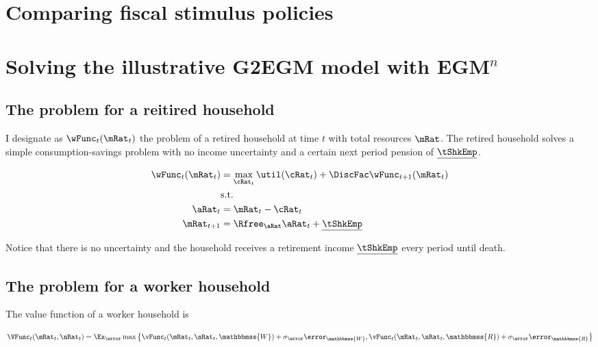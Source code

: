 \documentclass[\econtexRoot/SequentialEGM]{subfiles}
\begin{document}
\FloatBarrier
\hypertarget{comparing-fiscal-stimulus-policies}{}\par\section{Comparing fiscal stimulus policies}
\notinsubfile{\label{sec:comparing}}

\section{Solving the illustrative G2EGM model with EGM$^n$}

\subsection{The problem for a reitired household}

I designate as $\wFunc_{t}(\mRat_{t})$ the problem of a retired household at time $t$ with total resources $\mRat$. The retired household solves a simple consumption-savings problem with no income uncertainty and a certain next period pension of $\underline{\tShkEmp}$.

\begin{equation}
  \begin{split}
    \wFunc_{t}(\mRat_{t}) & = \max_{\cRat_{t}} \util(\cRat_{t}) +
    \DiscFac \wFunc_{t+1}(\mRat_{t}) \\
    & \text{s.t.} \\
    \aRat_{t} & = \mRat_{t} - \cRat_{t} \\
    \mRat_{t+1} & = \Rfree_{\aRat} \aRat_{t} +
    \underline{\tShkEmp}
  \end{split}
\end{equation}

Notice that there is no uncertainty and the household receives a retirement
income $\underline{\tShkEmp}$ every period until death.

\subsection{The problem for a worker household}

The value function of a worker household is

\providecommand{\Work}{\ensuremath{\mathbbmss{W}}}
\providecommand{\Retire}{\ensuremath{\mathbbmss{R}}}

\begin{equation}
  \VFunc_{t}(\mRat_{t}, \nRat_{t}) = \Ex_\error \max \left\{
  \vFunc_{t}(\mRat_{t}, \nRat_{t}, \Work) + \sigma_{\error}
  \error_{\Work} ,
  \vFunc_{t}(\mRat_{t}, \nRat_{t}, \Retire) + \sigma_{\error}
  \error_{\Retire} \right\}
\end{equation}
\end{document}
